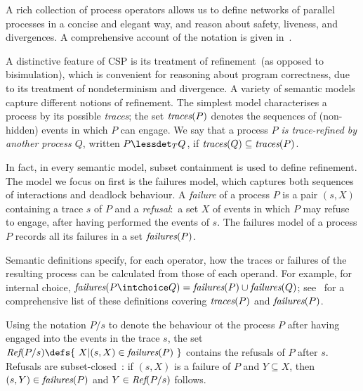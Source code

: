 A rich collection of process operators allows us to define networks of
parallel processes in a concise and elegant way, and reason about safety,
liveness, and divergences.  A comprehensive account of the notation is given
in~\cite{Roscoe2010}.

A distinctive feature of CSP is its treatment of refinement~(as opposed to
bisimulation), which is convenient for reasoning about program correctness,
due to its treatment of nondeterminism and divergence.  A variety of semantic
models capture different notions of refinement. The simplest model
characterises a process by its possible \emph{traces}; the set $\text{\it traces}(P)$
denotes the sequences of (non-hidden) events in which $P$ can engage.  We say
that a process \emph{$P$ is trace-refined by another process $Q$}, written $P
\lessdet_T Q$, if $\text{\it traces}(Q)\subseteq \text{\it traces}(P)$.

In fact, in every semantic model, subset containment is used to define refinement. The
model we focus on first is the failures model, which captures both
sequences of interactions and deadlock behaviour. A \emph{failure} of a process $P$
is a pair $(s,X)$ containing a trace $s$ of $P$ and a \emph{refusal}:~a set $X$ of
events in which $P$ may refuse to engage, after having performed the events of
$s$. The failures model of a process $P$ records all its failures in a set
$\text{\it failures}(P)$.

Semantic definitions specify, for each operator, how the traces or failures
of the resulting process can be calculated from those of each operand. For
example, for internal choice, $\fails(P\intchoice Q) =
\fails(P)\cup\fails(Q)$; see~\cite[p.~210]{Roscoe:1997:TPC:550448} for a
comprehensive list of these definitions covering $\text{\it traces}(P)$ and $\text{\it failures}(P)$.

Using the notation $P/s$ to denote the behaviour ot the process $P$ after
having engaged into the events in the trace $s$, the set $\refs(P/s) \defs
\{~X | (s,X) \in \fails(P)~\}$ contains the  refusals of $P$ after $s$.
Refusals are subset-closed~\cite{Hoare:1985:CSP:3921,Roscoe2010}: if $(s,X)$
is a failure of $P$ and $Y\subseteq X$, then $(s,Y)\in\text{\it failures}(P)$ and
$Y\in\text{\it Ref}(P/s)$ follows.

